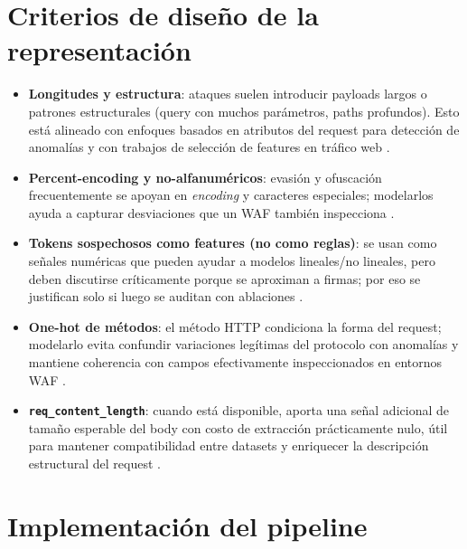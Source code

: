 \documentclass[12pt,oneside]{report}
\begin{document}
\section{Criterios de diseño de la representación}
\begin{itemize}[leftmargin=*]
  \item \textbf{Longitudes y estructura}: ataques suelen introducir payloads largos o patrones estructurales (query con muchos parámetros, paths profundos). Esto está alineado con enfoques basados en atributos del request para detección de anomalías y con trabajos de selección de features en tráfico web \cite{kruegel_vigna_2003,riverol_2024}.
  \item \textbf{Percent-encoding y no-alfanuméricos}: evasión y ofuscación frecuentemente se apoyan en \textit{encoding} y caracteres especiales; modelarlos ayuda a capturar desviaciones que un WAF también inspecciona \cite{owasp_waf,modsecurity_site}.
  \item \textbf{Tokens sospechosos como features (no como reglas)}: se usan como señales numéricas que pueden ayudar a modelos lineales/no lineales, pero deben discutirse críticamente porque se aproximan a firmas; por eso se justifican solo si luego se auditan con ablaciones \cite{kruegel_vigna_2003,riverol_2024}.
  \item \textbf{One-hot de métodos}: el método HTTP condiciona la forma del request; modelarlo evita confundir variaciones legítimas del protocolo con anomalías y mantiene coherencia con campos efectivamente inspeccionados en entornos WAF \cite{owasp_waf,modsecurity_site}.
  \item \textbf{\texttt{req\_content\_length}}: cuando está disponible, aporta una señal adicional de tamaño esperable del body con costo de extracción prácticamente nulo, útil para mantener compatibilidad entre datasets y enriquecer la descripción estructural del request \cite{srbh_paper,owasp_waf}.
\end{itemize}


\section{Implementación del pipeline}
\end{document}
